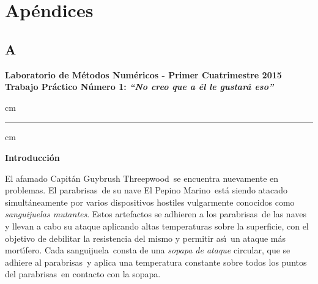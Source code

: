 \section{Apéndices}

\subsection{A}
\newcommand{\real}{\mathbb{R}}
\newcommand{\nat}{\mathbb{N}}

\newcommand{\atacante}{sanguijuela}
\newcommand{\capitan}{Capit\'an Guybrush Threepwood}
\newcommand{\objeto}{parabrisas}
\newcommand{\nave}{El Pepino Marino}
\newcommand{\titulotp}{``No creo que a \'el le gustar\'a eso''}

\newcommand{\revJ}[1]{{\color{red} #1}}

\addtolength{\topmargin}{-1cm}
\addtolength{\textheight}{2.2cm}
\addtolength{\textwidth}{-.5cm}

\begin{centering}
\large\bf Laboratorio de M\'etodos Num\'ericos - Primer Cuatrimestre 2015 \\
\large\bf Trabajo Pr\'actico N\'umero 1: \emph{\titulotp}\\
\end{centering}

 cm
\hrule
{} cm

{\noindent \bf Introducci\'on}

El afamado \capitan\ se encuentra nuevamente en problemas. El
\objeto\ de su nave \nave\ est\'a siendo atacado simult\'aneamente por varios
dispositivos hostiles vulgarmente conocidos como \emph{\atacante s
mutantes}. Estos artefactos se adhieren a los \objeto\ de las naves y
llevan a cabo su ataque aplicando altas temperaturas sobre la superficie, con
el objetivo de debilitar la resistencia del mismo y permitir as\'\i \
un ataque m\'as mort\'\i fero. Cada \atacante\ consta de una \emph{sopapa
de ataque} circular, que se adhiere al \objeto\ y aplica una temperatura
constante sobre todos los puntos del \objeto\ en contacto con la sopapa.

